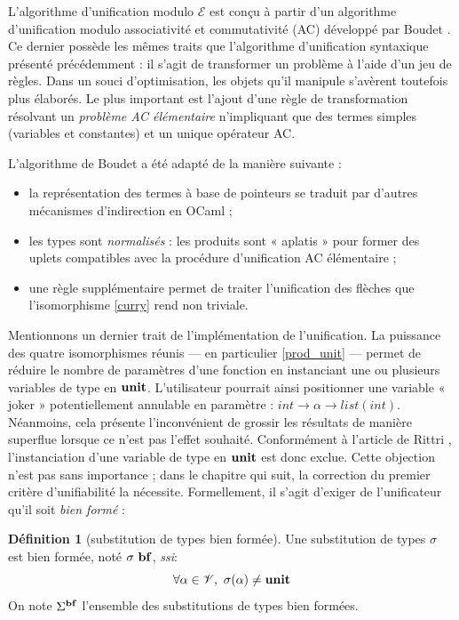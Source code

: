 \documentclass[a4paper]{report}
\theoremstyle{definition}
\newtheorem{definition}[theoreme]{Définition}
\newcommand{\ssi}{\textit{ssi}\xspace}
\newcommand{\unit}{\bold{unit}}
\newcommand{\V}{\mathscr{V}}
\newcommand{\E}{\mathscr{E}}
\begin{document}
L'algorithme d'unification modulo $\E$ est conçu à partir d'un algorithme d'unification modulo associativité et commutativité (AC) développé par Boudet \cite{Boudet}. Ce dernier possède les mêmes traits que l'algorithme d'unification syntaxique présenté précédemment : il s'agit de transformer un problème à l'aide d'un jeu de règles. Dans un souci d'optimisation, les objets qu'il manipule s'avèrent toutefois plus élaborés. Le plus important est l'ajout d'une règle de transformation résolvant un \emph{problème AC élémentaire} n'impliquant que des termes simples (variables et constantes) et un unique opérateur AC.

L'algorithme de Boudet a été adapté de la manière suivante :
\begin{itemize}[nosep]
  \item la représentation des termes à base de pointeurs se traduit par d'autres mécanismes d'indirection en OCaml ;
  \item les types sont \emph{normalisés} : les produits sont « aplatis » pour former des uplets compatibles avec la procédure d'unification AC élémentaire ;
  \item une règle supplémentaire permet de traiter l'unification des flèches que l'isomorphisme \eqref{curry} rend non triviale.
\end{itemize}

Mentionnons un dernier trait de l'implémentation de l'unification. La puissance des quatre isomorphismes réunis — en particulier \eqref{prod_unit} — permet de réduire le nombre de paramètres d'une fonction en instanciant une ou plusieurs variables de type en $\unit$. L'utilisateur pourrait ainsi positionner une variable « joker » potentiellement annulable en paramètre : $int \rightarrow \alpha \rightarrow list (int)$. Néanmoins, cela présente l'inconvénient de grossir les résultats de manière superflue lorsque ce n'est pas l'effet souhaité. Conformément à l'article de Rittri \cite{Rittri93}, l'instanciation d'une variable de type en $\unit$ est donc exclue. Cette objection n'est pas sans importance ; dans le chapitre qui suit, la correction du premier critère d'unifiabilité la nécessite. Formellement, il s'agit d'exiger de l'unificateur qu'il soit \emph{bien formé} :

\begin{definition}[substitution de types bien formée]
  Une substitution de types $\sigma$ est bien formée, noté $\sigma\ \bold{bf}$, \ssi :
  \[ \forall \alpha \in \V,\ \sigma (\alpha) \neq \unit \]
  On note $\Sigma^{\bold{bf}}$ l'ensemble des substitutions de types bien formées.
\end{definition}
\end{document}
